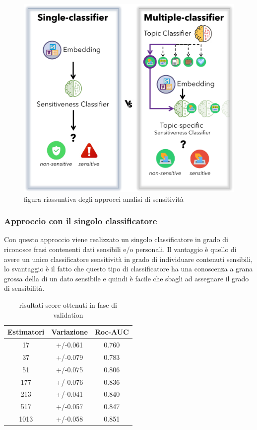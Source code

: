 \begin{figure}[h]
    \centering
    \includegraphics[width=15cm]{Figure/grafici/vs_cropped.pdf}
    \caption{figura riassuntiva degli approcci analisi di sensitività}
    \label{fig:approccisens}
\end{figure}
\FloatBarrier



\subsubsection{Approccio con il singolo classificatore}
\label{sssec:singleclass}
Con questo approccio viene realizzato un singolo classificatore in grado di riconosce frasi contenenti dati sensibili e/o personali. Il vantaggio è quello di avere un unico classificatore sensitività in grado di individuare contenuti sensibili, lo svantaggio è il fatto che questo tipo di classificatore ha una conoscenza a grana grossa della di un dato sensibile e quindi è facile che sbagli ad assegnare il grado di sensibilità.
\begin{table}[h]
\label{tbl:validation_sens}
\centering
\begin{tabular}{|c|c|c|}
\hline
\textbf{Estimatori} & \textbf{Variazione} & \textbf{Roc-AUC} \\ \hline
17 & +/-0.061 & 0.760 \\ \hline
37 & +/-0.079 & 0.783 \\ \hline
51 & +/-0.075 & 0.806 \\ \hline
177 & +/-0.076 & 0.836 \\ \hline
213 & +/-0.041 & 0.840 \\ \hline
517 & +/-0.057 & 0.847 \\ \hline
1013 & +/-0.058 & 0.851 \\ \hline
\end{tabular}
\caption{risultati score ottenuti in  fase di validation}
\end{table}
\FloatBarrier

